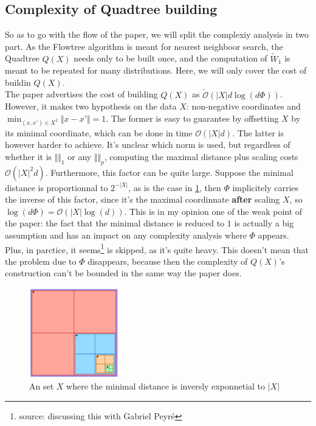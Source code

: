 \documentclass[11pt]{article}
\begin{document}
\subsection{Complexity of Quadtree building}\label{ssec:ComplexityQuadtreeBuilding}
So as to go with the flow of the paper, we will split the complexiy analysis in two part. As the Flowtree algorithm is meant for nearest neighboor search, the Quadtree $Q(X)$ needs only to be built once, and the computation of $\widetilde{W}_1$ is meant to be repeated for many distributions. Here, we will only cover the cost of buildin $Q(X)$.\\
The paper advertises the cost of building $Q(X)$ as $\widetilde{\mathcal{O}}(\vert X \vert d \log(d\Phi))$. 
However, it makes two hypothesis on the data $X$: non-negative coordinates and $\min_{(x, x') \in X^2} \Vert x - x' \Vert = 1$. 
The former is easy to guarantee by offsetting $X$ by its minimal coordinate, which can be done in time $\mathcal{O}(\vert X \vert d)$.
The latter is however harder to achieve. It's unclear which norm is used, but regardless of whether it is $\Vert \Vert_1$ or any $\Vert \Vert_p$, computing the maximal distance plus scaling costs $\mathcal{O}(\vert X \vert^2 d)$. Furthermore, this factor can be quite large. Suppose the minimal distance is proportionnal to $2^{-\vert X \vert}$, as is the case in \ref{worst_case_qb}, then $\Phi$ implicitely carries the inverse of this factor, since it's the maximal coordinnate \textbf{after} scaling $X$, so $\log(d\Phi) = \mathcal{O}(\vert X \vert \log(d))$. This is in my opinion one of the weak point of the paper: the fact that the minimal distance is reduced to $1$ is actually a big assumption and has an impact on any complexity analysis where $\Phi$ appears.\\
Plus, in parctice, it seems\footnote{source: discussing this with Gabriel Peyré} is skipped, as it's quite heavy. This doesn't mean that the problem due to $\Phi$ disappears, because then the complexity of $Q(X)$'s construction can't be bounded in the same way the paper does.

\begin{figure}[h]
\centering
\includegraphics[width=0.35\textwidth]{imgs/worst_case_qb.png}
\caption{An set $X$ where the minimal distance is inversly exponnetial to $\vert X \vert$}
\label{worst_case_qb}
\end{figure}
\end{document}
